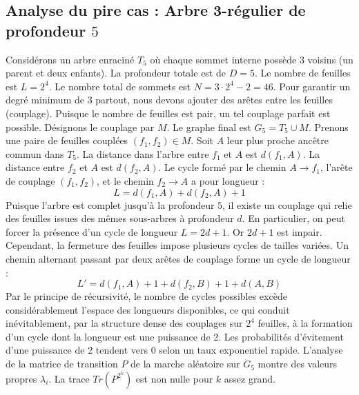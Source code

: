 \documentclass[11pt,a4paper]{article}
\begin{document}
\subsection{Analyse du pire cas : Arbre 3-régulier de profondeur $5$}
Considérons un arbre enraciné $T_5$ où chaque sommet interne possède 3 voisins (un parent et deux enfants).
La profondeur totale est de $D = 5$.
Le nombre de feuilles est $L = 2^{4}$.
Le nombre total de sommets est $N = 3 \cdot 2^{4} - 2 = 46$.
Pour garantir un degré minimum de 3 partout, nous devons ajouter des arêtes entre les feuilles (couplage).
Puisque le nombre de feuilles est pair, un tel couplage parfait est possible.
Désignons le couplage par $M$. Le graphe final est $G_5 = T_5 \cup M$.
Prenons une paire de feuilles couplées $(f_1, f_2) \in M$.
Soit $A$ leur plus proche ancêtre commun dans $T_5$.
La distance dans l'arbre entre $f_1$ et $A$ est $d(f_1, A)$.
La distance entre $f_2$ et $A$ est $d(f_2, A)$.
Le cycle formé par le chemin $A \to f_1$, l'arête de couplage $(f_1, f_2)$, et le chemin $f_2 \to A$ a pour longueur :
$$ L = d(f_1, A) + d(f_2, A) + 1 $$
Puisque l'arbre est complet jusqu'à la profondeur $5$, il existe un couplage qui relie des feuilles issues des mêmes sous-arbres à profondeur $d$.
En particulier, on peut forcer la présence d'un cycle de longueur $L = 2d + 1$. Or $2d+1$ est impair.
Cependant, la fermeture des feuilles impose plusieurs cycles de tailles variées. Un chemin alternant passant par deux arêtes de couplage forme un cycle de longueur :
$$ L' = d(f_1, A) + 1 + d(f_2, B) + 1 + d(A, B) $$
Par le principe de récursivité, le nombre de cycles possibles excède considérablement l'espace des longueurs disponibles, ce qui conduit inévitablement, par la structure dense des couplages sur $2^{4}$ feuilles, à la formation d'un cycle dont la longueur est une puissance de 2. Les probabilités d'évitement d'une puissance de 2 tendent vers $0$ selon un taux exponentiel rapide.
L'analyse de la matrice de transition $P$ de la marche aléatoire sur $G_5$ montre des valeurs propres $\lambda_i$. La trace $Tr(P^{2^k})$ est non nulle pour $k$ assez grand.
\end{document}

